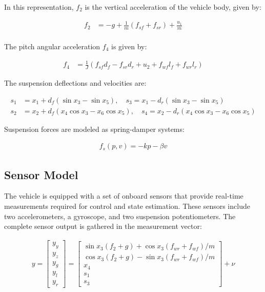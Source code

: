 \documentclass[]{report}
\begin{document}
In this representation, $f_2$ is the vertical acceleration of the vehicle body, given by:

\begin{align}
	f_2 &= -g + \frac{1}{m}(f_{sf} + f_{sr}) + \frac{u_1}{m} \\
\end{align}

The pitch angular acceleration $f_4$ is given by:

\begin{align}	
	f_4 &= \frac{1}{J}(f_{sf} d_f - f_{sr} d_r + u_2 + f_{wf} l_{f} + f_{wr} l_{r})
\end{align}


The suspension deflections and velocities are:

\begin{align}
	s_1 &= x_1 + d_f(\sin x_3 - \sin x_5), \quad s_3 = x_1 - d_r(\sin x_3 - \sin x_5) \\
	s_2 &= x_2 + d_f(x_4 \cos x_3 - x_6 \cos x_5), \quad s_4 = x_2 - d_r(x_4 \cos x_3 - x_6 \cos x_5)
\end{align}

Suspension forces are modeled as spring-damper systems:

\begin{align}
	f_s(p, v) = -k p - \beta v
\end{align}

\subsection{Sensor Model}

The vehicle is equipped with a set of onboard sensors that provide real-time measurements required for control and state estimation. These sensors include two accelerometers, a gyroscope, and two suspension potentiometers. The complete sensor output is gathered in the measurement vector:

\begin{align}
	y = \begin{bmatrix}
		y_y \\ y_z \\ y_g \\ y_l \\ y_r
	\end{bmatrix} =
	\begin{bmatrix}
		\sin x_3(f_2 + g) + \cos x_3(f_{wr} + f_{wf})/m \\
		\cos x_3(f_2 + g) - \sin x_3(f_{wr} + f_{wf})/m \\
		x_4 \\
		s_1 \\
		s_3
	\end{bmatrix} + \nu
\end{align}
\end{document}
